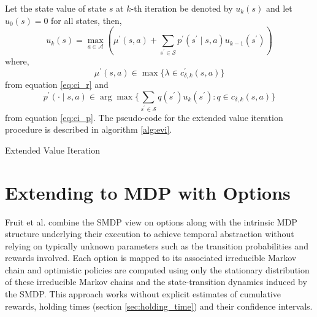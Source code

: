 Let the state value of state $s$ at $k$-th iteration be denoted by $u_k(s)$ and let $u_0(s) = 0$ for all states, then,
\begin{equation}
    u_k(s) = \max_{a \in \mathcal{A}} \left( \mu^\prime(s,a) + \sum_{s^\prime \in \mathcal{S}} {p^\prime(s^\prime \mid s, a) u_{k-1}(s^\prime)} \right)
\end{equation}
where, 
$$\mu^\prime(s,a) \in \max \{ \lambda \in c^\prime_{\delta, k} (s,a) \}$$
from equation \ref{eq:ci_r} and 
$$p^\prime(\cdot \mid s, a) \in \arg\max \{ \sum_{s^\prime \in \mathcal{S}} {q(s^\prime) u_k(s^\prime) : q \in c_{\delta, k} (s,a)} \}$$ 
from equation  \ref{eq:ci_p}.
The pseudo-code for the extended value iteration procedure is described in algorithm \ref{alg:evi}.

\begin{algorithm}
\caption{Extended Value Iteration}\label{alg:evi}



\BlankLine
{}
\BlankLine
{}
\end{algorithm}

\section{Extending to MDP with Options}

Fruit et al. \cite{fruit_exploration--exploitation_2017, fruit_regret_2017} combine the SMDP view on options along with the intrinsic MDP structure underlying their execution to achieve temporal abstraction without relying on typically unknown parameters such as the transition probabilities and rewards involved.
Each option is mapped to its associated irreducible Markov chain and optimistic policies are computed using only the stationary distribution of these irreducible Markov chains and the state-transition dynamics induced by the SMDP. 
This approach works without explicit estimates of cumulative rewards, holding times (section \ref{sec:holding_time}) and their confidence intervals.

